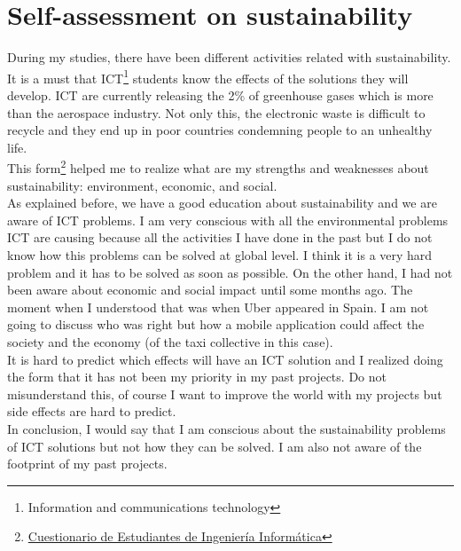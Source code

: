 
\chapter{Self-assessment on sustainability} %

\label{Chapter1}

During my studies, there have been different activities related with sustainability. It is a must that ICT\footnote{Information and communications technology} students know the effects of the solutions they will develop. 
ICT are currently releasing the 2\% of greenhouse gases\cite{Universidad2013} which is more than the aerospace industry. Not only this, the electronic waste is difficult to recycle and they end up in poor countries\cite{Ghana} condemning people to an unhealthy life.\\

This form\footnote{\href{goo.gl/kWLMLE}{Cuestionario de Estudiantes de Ingeniería Informática}} helped me to realize what are my strengths and weaknesses about sustainability: environment, economic, and social.\\

As explained before, we have a good education about sustainability and we are aware of ICT problems. I am very conscious with all the environmental problems ICT are causing because all the activities I have done in the past but I do not know how this problems can be solved at global level. I think it is a very hard problem and it has to be solved as soon as possible. On the other hand, I had not been aware about economic and social impact until some months ago. The moment when I understood that was when Uber appeared in Spain\cite{UberTaxi}. I am not going to discuss who was right but how a mobile application could affect the society and the economy (of the taxi collective in this case).\\

It is hard to predict which effects will have an ICT solution and I realized doing the form that it has not been my priority in my past projects. Do not misunderstand this, of course I want to improve the world with my projects but side effects are hard to predict. \\

In conclusion, I would say that I am conscious about the sustainability problems of ICT solutions but not how they can be solved. I am also not aware of the footprint of my past projects. 
